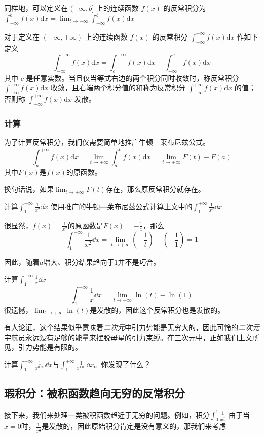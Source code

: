 同样地，可以定义在 $(-\infty,b]$ 上的连续函数 $f(x)$ 的反常积分为 $\displaystyle \int ^b _{-\infty}f(x)\mathrm{d} x=\lim_{t\rightarrow-\infty }\int ^b _{-\infty}f(x)\mathrm{d} x$

对于定义在 $(-\infty,+\infty )$ 上的连续函数 $f(x)$ 的反常积分 $\displaystyle \int ^{+\infty}_{-\infty}f(x)\mathrm{d} x$ 作如下定义
$$\displaystyle \int ^{+\infty}_{-\infty}f(x)\mathrm{d} x=\displaystyle \int ^{+\infty}_c f(x)\mathrm{d} x+\displaystyle \int ^c _{-\infty}f(x)\mathrm{d} x$$
其中 $c$ 是任意实数。当且仅当等式右边的两个积分同时收敛时，称反常积分 $\displaystyle \int ^{+\infty}_{-\infty}f(x)\mathrm{d} x$ 收敛，且右端两个积分值的和称为反常积分 $\displaystyle \int ^{+\infty}_{-\infty}f(x)\mathrm{d} x$ 的值；否则称 $\displaystyle \int ^{+\infty}_{-\infty}f(x)\mathrm{d} x$ 发散。

\subsubsection{计算}
为了计算反常积分，我们仅需要简单地推广牛顿—莱布尼兹公式。
\begin{equation}
\displaystyle \int ^{+\infty}_a f(x)\mathrm{d} x=\lim_{t\rightarrow+\infty }\int _a^{t}f(x)\mathrm{d} x
=\lim_{t\rightarrow+\infty }F(t) - F(a)
\end{equation}
其中$F(x)$是$f(x)$的原函数。

换句话说，如果$\lim_{t\rightarrow+\infty } F(t)$存在，那么原反常积分就存在。

\begin{example}{计算$\int^{+\infty}_1 \frac{1}{x^2} \dd x$}
使用推广的牛顿—莱布尼兹公式计算上文中的$\int^{+\infty}_1 \frac{1}{x^2} \dd x$

很显然，$f(x)=\frac{1}{x^2}$的原函数是$F(x)=-\frac{1}{x}$，那么
$$\int^{+\infty}_1 \frac{1}{x^2} \dd x=\lim_{t\rightarrow+\infty } (-\frac{1}{t}) - (-\frac{1}{1})=1$$

因此，随着$a$增大、积分结果趋向于$1$并不是巧合。
\end{example}

\begin{example}{计算$\int^{+\infty}_1 \frac{1}{x} \dd x$}
$$\int^{+\infty}_1 \frac{1}{x} \dd x=\lim_{t\rightarrow+\infty } {\ln(t)} - \ln(1)$$
很遗憾，$\lim_{t\rightarrow+\infty } {\ln(t)} $是发散的，因此这个反常积分也是发散的。

有人论证，这个结果似乎意味着\textsl{二次元}中引力势能是无穷大的，因此可怜的\textsl{二次元}宇航员永远没有足够的能量来摆脱母星的引力束缚。在三次元中，正如我们上文所见，引力势能是有限的。

\end{example}

\begin{exercise}{}
计算$\int^{+\infty}_1 \frac{1}{x^{0.99}} \dd x$与$\int^{+\infty}_1 \frac{1}{x^{1.01}} \dd x$。你发现了什么？
\end{exercise}

\subsection{瑕积分：被积函数趋向无穷的反常积分}
接下来，我们来处理一类被积函数趋近于无穷的问题。例如，积分$\int_0^1 \frac{1}{x^{\frac{4}{5}}}$
由于当$x=0$时，$\frac{1}{x^{\frac{4}{5}}}$是发散的，因此原始积分肯定是没有意义的，那我们来考虑